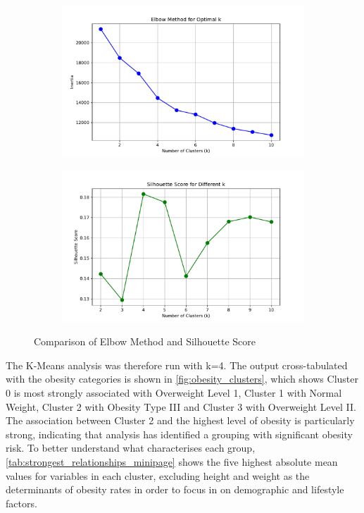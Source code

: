 \begin{figure}[!h]
    \centering
    \begin{subfigure}[b]{0.8\textwidth}
        \centering
        \includegraphics[width=\textwidth]{elbow.pdf}
        \label{fig:elbow}
    \end{subfigure}
    \hfill
    \begin{subfigure}[b]{0.8\textwidth}
        \centering
        \includegraphics[width=\textwidth]{silhouette.pdf}
        \label{fig:silhouette}
    \end{subfigure}
    \caption{Comparison of Elbow Method and Silhouette Score}
    \label{fig:elbow_silhouette}
\end{figure}

The K-Means analysis was therefore run with k=4. The output cross-tabulated with the obesity categories is shown in \ref{fig:obesity_clusters}, which shows Cluster 0 is most strongly associated with Overweight Level 1, Cluster 1 with Normal Weight, Cluster 2 with Obesity Type III and Cluster 3 with Overweight Level II. The association between Cluster 2 and the highest level of obesity is particularly strong, indicating that analysis has identified a grouping with significant obesity risk. To better understand what characterises each group, \ref{tab:strongest_relationships_minipage} shows the five highest absolute mean values for variables in each cluster, excluding height and weight as the determinants of obesity rates in order to focus in on demographic and lifestyle factors.

